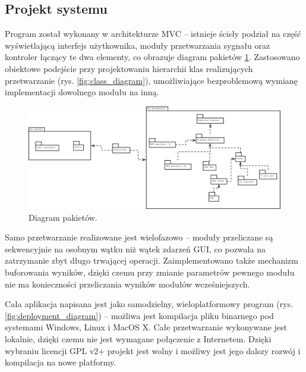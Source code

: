 \documentclass[a4paper, 11pt]{article}
\begin{document}
\subsection{Projekt systemu}
\label{sec:sys_proj}

Program został wykonany w architekturze MVC -- istnieje ścisły podział na część wyświetlającą interfejs użytkownika, moduły przetwarzania sygnału oraz kontroler łączący te dwa elementy, co obrazuje diagram pakietów \ref{fig:package_diagram}. Zastosowano obiektowe podejście przy projektowaniu hierarchii klas realizujących przetwarzanie (rys. \ref{fig:class_diagram}), umożliwiające bezproblemową wymianę implementacji dowolnego modułu na inną.

\begin{figure}[h!]
  \centering
  \includegraphics[width=\linewidth]{include/package_diagram}
  \caption{Diagram pakietów.}
  \label{fig:package_diagram}
\end{figure}

Samo przetwarzanie realizowane jest wielofazowo -- moduły przeliczane są sekwencyjnie na osobnym wątku niż wątek zdarzeń GUI, co pozwala na zatrzymanie zbyt długo trwającej operacji. Zaimplementowano także mechanizm buforowania wyników, dzięki czemu przy zmianie parametrów pewnego modułu nie ma konieczności przeliczania wyników modułów wcześniejszych.

Cała aplikacja napisana jest jako samodzielny, wieloplatformowy program (rys. \ref{fig:deployment_diagram}) -- możliwa jest kompilacja pliku binarnego pod systemami Windows, Linux i MacOS X. Całe przetwarzanie wykonywane jest lokalnie, dzięki czemu nie jest wymagane połączenie z Internetem. Dzięki wybraniu licencji GPL v2+ projekt jest wolny i możliwy jest jego dalszy rozwój i kompilacja na nowe platformy.
\end{document}
